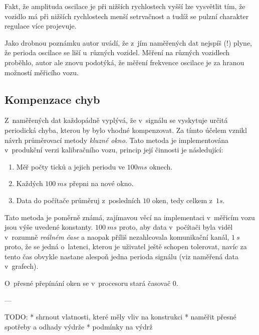 \begin{enumerate}
Fakt, že amplituda oscilace je při nižších rychlostech vyšší lze vysvětlit tím,
že vozidlo má při nižších rychlostech menší setrvačnost a tudíž se pulzní
charakter regulace více projevuje.

Jako drobnou poznámku autor uvádí, že z~jím naměřených dat nejspíš (!) plyne,
že perioda oscilace se liší u~různých vozidel. Měření na různých vozidlech
proběhlo, autor ale znovu podotýká, že měření frekvence oscilace je za hranou
možností měřicího vozu.

\subsection{Kompenzace chyb}
\label{subsec:wsm-kompenzace}

Z~naměřených dat každopádně vyplývá, že v~signálu se vyskytuje určitá
periodická chyba, kterou by bylo vhodné kompenzovat. Za tímto účelem vznikl
návrh průměrovací metody \textit{kluzné okno}. Tato metoda je implementována
v~produkční verzi kalibračního vozu, princip její činnosti je následující:

\begin{enumerate}
\item Měř počty ticků a jejich periodu ve $100ms$ oknech.
\item Každých $100\ ms$ přepni na nové okno.
\item Data do počítače průměruj z~posledních $10$ oken, tedy celkem z~$1 s$.
\end{enumerate}

Tato metoda je poměrně známá, zajímavou věcí na implementaci v~měřicím vozu
jsou výše uvedené konstanty. $100\ ms$ proto, aby data v~počítači byla viděl
v~rozumně \textit{reálném čase} a naopak příliš nezahlcovala komunikační kanál,
$1\ s$ proto, že se jedná o~latenci, kterou je uživatel ještě schopen tolerovat,
navíc za tento čas obvykle nastane alespoň jedna perioda signálu (viz naměřená
data v~grafech).

O~přesné přepínání oken se v~procesoru stará časovač 0.

\end{enumerate}

---

TODO:
 * shrnout vlatnosti, které měly vliv na konstrukci
 * naměřit přesné spotřeby a odhady výdrže
 * podmínky na výdrž
